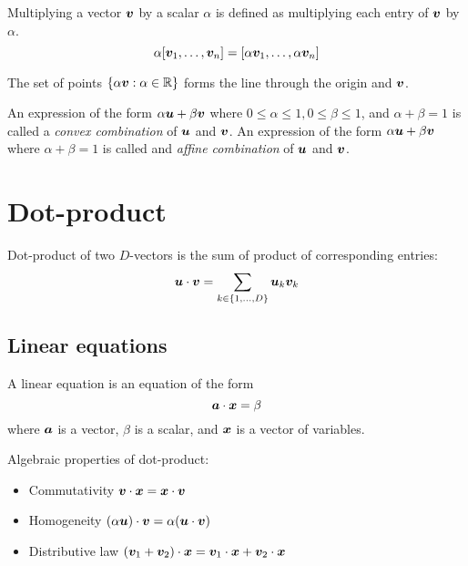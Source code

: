 \begin{definition}
  Multiplying a vector ${\bm{v}}$ by a scalar $\alpha$ is defined as multiplying each entry of ${\bm{v}}$ by $\alpha$.
  \begin{equation*}
    \alpha [{\bm{v}}_1, \ldots, {\bm{v}}_n] = [\alpha{\bm{v}}_1, \ldots, \alpha{\bm{v}}_n]
  \end{equation*}
\end{definition}

The set of points $\{ \alpha{\bm{v}} : \alpha\in\mathbb{R} \}$ forms the line through the origin and ${\bm{v}}$.

An expression of the form $\alpha{\bm{u}} + \beta{\bm{v}}$ where $0 \le \alpha \le 1, 0 \le \beta \le 1$, and $\alpha + \beta = 1$ is called a \emph{convex combination} of ${\bm{u}}$ and ${\bm{v}}$. An expression of the form $\alpha{\bm{u}} + \beta{\bm{v}}$ where $\alpha+\beta=1$ is called and \emph{affine combination} of ${\bm{u}}$ and ${\bm{v}}$.


\section{Dot-product}
\begin{definition}
  Dot-product of two $D$-vectors is the sum of product of corresponding entries:
  \begin{equation*}
    {\bm{u}} \cdot {\bm{v}} = \sum_{k\in\{1, \ldots, D\}} {\bm{u}}_k {\bm{v}}_k
  \end{equation*}
\end{definition}

\subsection{Linear equations}
\begin{definition}
  A linear equation is an equation of the form
  \begin{equation*}
    {\bm{a}} \cdot {\bm{x}} = \beta
  \end{equation*}
  where ${\bm{a}}$ is a vector, $\beta$ is a scalar, and ${\bm{x}}$ is a vector of variables.
\end{definition}

Algebraic properties of dot-product:
\begin{itemize}
\item Commutativity ${\bm{v}} \cdot {\bm{x}} = {\bm{x}} \cdot {\bm{v}}$
\item Homogeneity $(\alpha{\bm{u}})\cdot{\bm{v}} = \alpha({\bm{u}}\cdot{\bm{v}})$
\item Distributive law $({\bm{v}}_1 + {\bm{v}}_2)\cdot{\bm{x}} = {\bm{v}}_1\cdot{\bm{x}} + {\bm{v}}_2\cdot{\bm{x}}$
\end{itemize}
